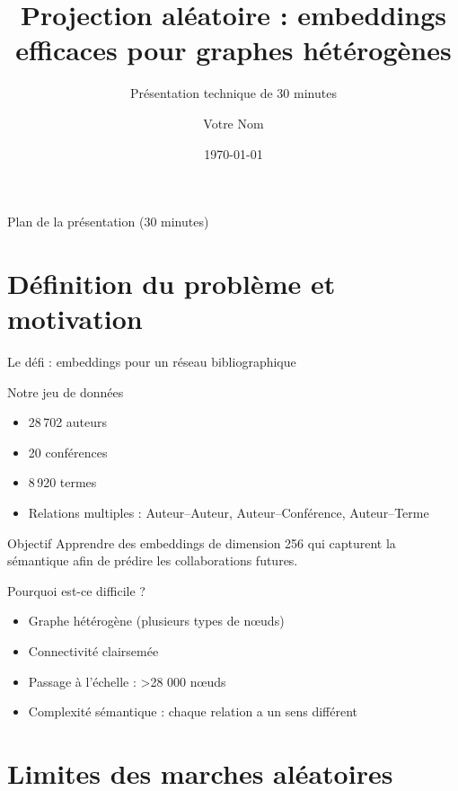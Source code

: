 \documentclass[9pt,aspectratio=169,professionalfonts]{beamer}
\title[Projection aléatoire pour graphes hétérogènes]{Projection aléatoire : embeddings efficaces pour graphes hétérogènes}
\subtitle{Présentation technique de 30 minutes}
\author{Votre Nom}
\institute{Votre Institution}
\date{\today}
\begin{document}
\begin{frame}
  \titlepage
\end{frame}

\begin{frame}{Plan de la présentation (30 minutes)}
  \tableofcontents
\end{frame}

\section{Définition du problème et motivation}

\begin{frame}{Le défi : embeddings pour un réseau bibliographique}
\begin{block}{Notre jeu de données}
\begin{itemize}
    \item 28\,702 auteurs
    \item 20 conférences
    \item 8\,920 termes
    \item Relations multiples : Auteur–Auteur, Auteur–Conférence, Auteur–Terme
\end{itemize}
\end{block}

\begin{block}{Objectif}
Apprendre des embeddings de dimension 256 qui capturent la sémantique afin de prédire les collaborations futures.
\end{block}

\begin{alertblock}{Pourquoi est-ce difficile ?}
\begin{itemize}
    \item Graphe hétérogène (plusieurs types de nœuds)
    \item Connectivité clairsemée
    \item Passage à l'échelle : >28 000 nœuds
    \item Complexité sémantique : chaque relation a un sens différent
\end{itemize}
\end{alertblock}
\end{frame}

\section{Limites des marches aléatoires}
\end{document}
